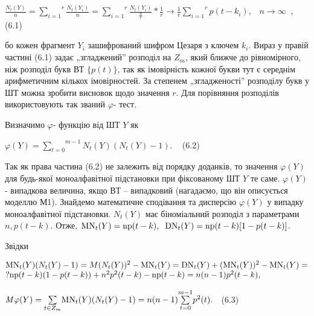 \documentclass[a4paper]{article}
\newcounter{}
\newcommand\normalsubformula[1]{\text{\mathversion{normal}$#1$}}
\begin{document}
{\raggedleft
 ${\frac{N_{{t}}(Y)}{n}=\overset{{r}}{\underset{{i=1}}{\sum
}}{\frac{N_{{t}}(Y_{{i}})}{n}=\overset{{r}}{\underset{{i=1}}{\sum
}}{\frac{N_{{t}}(Y_{{i}})}{\frac{n}{r}}\ast {\frac{1}{r}}\rightarrow
\frac{1}{r}\overset{{r}}{\underset{{i=1}}{\sum
}}{p(t-k_{{i}})}}},\;\;\;n\rightarrow \infty \;\;,\;\;\;\;\;}$  (6.1)
\par}

бо кожен фрагмент  ${Y_{{i}}}$ зашифрований шифром Цезаря з ключем  ${k_{{i}}}$.
 Вираз у правій частині (6.1) задає „згладжений” розподіл на  ${Z_{{m}}}$, який
ближче до рівномірного, ніж розподіл букв ВТ  ${\{p(t)\}}$, так як імовірність
кожної букви тут є середнім арифметичним кількох імовірностей. За степенем
„згладженості” розподілу букв у ШТ можна зробити висновок щодо значення  ${r}$.
Для порівняння розподілів використовують так званий  ${\varphi }${}- тест. 

\textit{ }Визначимо  ${\varphi }${}- функцію від ШТ  ${Y}$ як

{\raggedleft
  ${\varphi (Y)=\overset{{m-1}}{\underset{{t=0}}{\sum
}}{N_{{t}}(Y)(N_{{t}}(Y)-1)\text{.}\;\;\;}}$  (6.2)
\par}

Так як права частина (6.2) не залежить від порядку доданків, то значення 
${\varphi (Y)}$ для будь-якої моноалфавітної підстановки при фіксованому ШТ 
${Y}$ те саме.   ${\varphi (Y)}${}- випадкова величина, якщо ВТ – випадковий
(нагадаємо, що він описується моделлю М1). Знайдемо математичне сподівання та
дисперсію  ${\varphi (Y)}$ у випадку моноалфавітної підстановки. 
${N_{{t}}(Y)}$ має біноміальний розподіл з параметрами  ${n,p(t-k)}$. Отже, 
${\normalsubformula{\text{MN}}_{{t}}(Y)=\normalsubformula{\text{np}}(t-k),\;\;\normalsubformula{\text{DN}}_{{t}}(Y)=\normalsubformula{\text{np}}(t-k)[1-p(t-k)]}$.

Звідки

\begin{equation*}
\begin{matrix}{\normalsubformula{\text{MN}}_{{t}}(Y)(N_{{t}}(Y)-1)=M(N_{{t}}(Y))^{{2}}-\normalsubformula{\text{MN}}_{{t}}(Y)=\normalsubformula{\text{DN}}_{{t}}(Y)+(\normalsubformula{\text{MN}}_{{t}}(Y))^{{2}}-\normalsubformula{\text{MN}}_{{t}}(Y)=}\hfill\null
\\?\normalsubformula{\text{np}}(t-k)(1-p(t-k))+n^{{2}}p^{{2}}(t-k)-\normalsubformula{\text{np}}(t-k)=n(n-1)p^{{2}}(t-k),\hfill\null
\end{matrix}\hfill 
\end{equation*}
{\raggedleft
  ${\mathit{M\varphi }(Y)=\underset{{t\in Z_{{m}}}}{\sum
}{\normalsubformula{\text{MN}}_{{t}}(Y)(N_{{t}}(Y)-1)=n(n-1)\overset{{m-1}}{\underset{{t=0}}{\sum
}}{p^{{2}}(t)}}\text{.}\;\;}$  (6.3)
\par}
\end{document}
